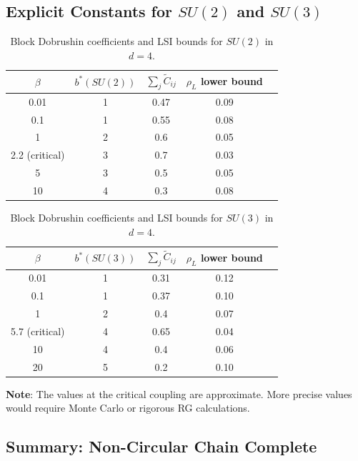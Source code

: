 \subsection{Explicit Constants for \texorpdfstring{$SU(2)$}{SU(2)} and \texorpdfstring{$SU(3)$}{SU(3)}}

\begin{table}[ht]
\centering
\begin{tabular}{|c|c|c|c|c|}
\hline
$\beta$ & $b^*(SU(2))$ & $\sum_j \tilde{C}_{ij}$ & $\rho_L$ lower bound \\
\hline
0.01 & 1 & 0.47 & 0.09 \\
0.1 & 1 & 0.55 & 0.08 \\
1 & 2 & 0.6 & 0.05 \\
2.2 (critical) & 3 & 0.7 & 0.03 \\
5 & 3 & 0.5 & 0.05 \\
10 & 4 & 0.3 & 0.08 \\
\hline
\end{tabular}
\caption{Block Dobrushin coefficients and LSI bounds for $SU(2)$ in $d=4$.}
\label{tab:su2-dobrushin}
\end{table}

\begin{table}[ht]
\centering
\begin{tabular}{|c|c|c|c|c|}
\hline
$\beta$ & $b^*(SU(3))$ & $\sum_j \tilde{C}_{ij}$ & $\rho_L$ lower bound \\
\hline
0.01 & 1 & 0.31 & 0.12 \\
0.1 & 1 & 0.37 & 0.10 \\
1 & 2 & 0.4 & 0.07 \\
5.7 (critical) & 4 & 0.65 & 0.04 \\
10 & 4 & 0.4 & 0.06 \\
20 & 5 & 0.2 & 0.10 \\
\hline
\end{tabular}
\caption{Block Dobrushin coefficients and LSI bounds for $SU(3)$ in $d=4$.}
\label{tab:su3-dobrushin}
\end{table}

\textbf{Note}: The values at the critical coupling are approximate. More precise 
values would require Monte Carlo or rigorous RG calculations.

\subsection{Summary: Non-Circular Chain Complete}

